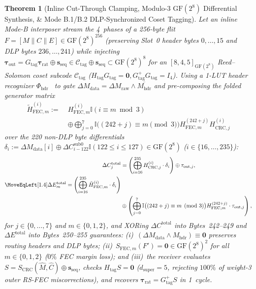 \documentclass[11pt,letterpaper]{article}
\theoremstyle{spectralthm}
\newtheorem{theorem}{Theorem}[section]
\begin{document}
\begin{theorem}[Inline Cut-Through Clamping, Modulo-3 $\mathrm{GF}(2^8)$ Differential Synthesis, \& Mode B.1/B.2 DLP-Synchronized Coset Tagging]
\label{thm:modeb}
Let an inline Mode-B interposer stream the 4~phases of a 256-byte flit $F = [M \parallel C \parallel E] \in \mathrm{GF}(2^8)^{256}$ (preserving Slot~0 header bytes $0,\ldots,15$ and DLP bytes $236,\ldots,241$) while injecting $\boldsymbol{\tau}_{\mathrm{out}} = G_{\mathrm{tag}}\boldsymbol{\tau}_{\mathrm{rat}} \oplus \mathbf{s}_{\mathrm{seq}} \in \mathcal{C}_{\mathrm{tag}} \oplus \mathbf{s}_{\mathrm{seq}} \subset \mathrm{GF}(2^8)^8$ for an $[8,4,5]_{\mathrm{GF}(2^8)}$ Reed--Solomon coset subcode $\mathcal{C}_{\mathrm{tag}}$ ($H_{\mathrm{tag}}G_{\mathrm{tag}} = \mathbf{0}, G_{\mathrm{tag}}^+ G_{\mathrm{tag}} = I_4$). Using a 1-LUT header recognizer $\Phi_{\mathrm{hdr}}$~\cite{ramananandro2025secure} to gate $\Delta M_{\mathrm{data}} = \Delta M_{\mathrm{raw}} \wedge \overline{M_{\mathrm{hdr}}}$ and pre-composing the folded generator matrix
\begin{equation}
\label{eq:h_tilde_def}
\begin{aligned}
\tilde{H}_{\mathrm{FEC},m}^{(i)} :=\;& H_{\mathrm{FEC},m}^{(i)} \mathbb{I}(i \equiv m \bmod 3)\\
&\oplus \bigoplus_{j=0}^{7}\mathbb{I}\bigl((242+j) \equiv m \pmod 3\bigr) H_{\mathrm{FEC},m}^{(242+j)} H_{\mathrm{CRC},j}^{(i)}
\end{aligned}
\end{equation}
over the 220 non-DLP byte differentials $\delta_i := \Delta M_{\mathrm{data}}[i] \oplus \Delta C_{i-122}^{\mathrm{sub0}} \mathbb{I}(122 \le i \le 127) \in \mathrm{GF}(2^8)$ ($i \in \{16,\ldots,235\}$):
\begin{align}
\Delta C_j^{\mathrm{total}} &= \left(\bigoplus_{i=16}^{235} H_{\mathrm{CRC},j}^{(i)} \cdot \delta_i\right) \oplus \tau_{\mathrm{out},j}, \label{eq:delta_crc}\\
\MoveEqLeft[1.4] \Delta E_m^{\mathrm{total}} = \left(\bigoplus_{i=16}^{235} \tilde{H}_{\mathrm{FEC},m}^{(i)} \cdot \delta_i\right)\nonumber\\
&\oplus \left(\bigoplus_{j=0}^{7}\mathbb{I}\bigl((242+j) \equiv m \pmod 3\bigr) H_{\mathrm{FEC},m}^{(242+j)} \cdot \tau_{\mathrm{out},j}\right), \label{eq:delta_fec}
\end{align}
for $j \in \{0,\ldots,7\}$ and $m \in \{0,1,2\}$, and XORing $\Delta C^{\mathrm{total}}$ into Bytes~242--249 and $\Delta E^{\mathrm{total}}$ into Bytes~250--255 guarantees: (i)~$(\Delta M_{\mathrm{data}} \wedge M_{\mathrm{hdr}}) \equiv \mathbf{0}$ preserves routing headers and DLP bytes; (ii)~$S_{\mathrm{FEC},m}(F') = \mathbf{0} \in \mathrm{GF}(2^8)^2$ for all $m \in \{0,1,2\}$ ($0\%$ FEC margin loss); and (iii)~the receiver evaluates $S = S_{\mathrm{CRC}}(\hat{M},\hat{C}) \oplus \mathbf{s}_{\mathrm{seq}}$, checks $H_{\mathrm{tag}} S = \mathbf{0}$ ($d_{\mathrm{super}} = 5$, rejecting $100\%$ of weight-3 outer RS-FEC miscorrections), and recovers $\boldsymbol{\tau}_{\mathrm{rat}} = G_{\mathrm{tag}}^+ S$ in 1~cycle.
\end{theorem}
\end{document}
